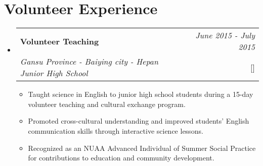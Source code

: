 \documentclass[a4paper,11pt]{article}
\makeatletter
\newcommand{\resumePOR}[3]{
	\vspace{0.5mm}\item
	\begin{tabular*}{0.97\textwidth}[t]{l@{\extracolsep{\fill}}r}
		\textbf{#1}\hspace{0.3mm}#2 & \textit{\small{#3}} 
	\end{tabular*}
	\vspace{-2mm}
}
\newcommand{\resumeProject}[4]{
	\vspace{0.5mm}\item
	\begin{tabular*}{0.98\textwidth}[t]{l@{\extracolsep{\fill}}r}
		\textbf{#1} & \textit{\footnotesize{#3}} \\
		\footnotesize{\textit{#2}} & \footnotesize{#4}
	\end{tabular*}
	\vspace{-2.4mm}
}
\newcommand{\resumeSubHeadingListStart}{\begin{itemize}[leftmargin=*,labelsep=1mm]}
\newcommand{\resumeItemListStart}{\begin{itemize}[leftmargin=*,labelsep=1mm,itemsep=0.5mm]}
\newcommand{\resumeSubHeadingListEnd}{\end{itemize}\vspace{2mm}}
\newcommand{\resumeItemListEnd}{\end{itemize}\vspace{-2mm}}
\makeatother
\begin{document}
	\section{\textbf{Volunteer Experience}}
	\vspace{-0.4mm}
	\resumeSubHeadingListStart

	\resumeProject
	{Volunteer Teaching}
	{Gansu Province - Baiying city - Hepan Junior High School}
	{June 2015 - July 2015}
	{{}[\href{https://1drv.ms/b/c/0b66680558f854cf/EWhZisbqvTNClGJQgjoSEg8BX4o5KTUrmbUno6iK2k-XtA?e=4Ugpkl}{\textcolor{darkblue}{\faIcon{globe}}}]}
	\resumeItemListStart
	\item Taught science in English to junior high school students during a 15-day volunteer teaching and cultural exchange program.
	\item Promoted cross-cultural understanding and improved students' English communication skills through interactive science lessons.
	\item Recognized as an NUAA Advanced Individual of Summer Social Practice for contributions to education and community development.
	\resumeItemListEnd
	
	\resumeSubHeadingListEnd
	\vspace{-6mm}
	
	\begin{comment}
	\section{\textbf{Professional Memberships}}
	\vspace{-0.4mm}
	\resumeSubHeadingListStart
	\resumePOR{Professional Organization A}
	{, Membership ID: XXXXXXXX}
	{Month Year - Present}
	\resumePOR{Professional Organization B}
	{, \href{https://membership-certificate-link.com}{Membership ID: XXXXXXXX}}
	{Month Year - Present}
	\resumePOR{Professional Organization C}
	{, \href{https://membership-certificate-link.com}{Membership ID: XXXXXXXX}}
	{Month Year - Present}
	
	\resumeSubHeadingListEnd
	\vspace{-6mm}
	
	\section{\textbf{Certifications}}
	\vspace{-0.2mm}
	\resumeSubHeadingListStart
	\resumePOR{}{\href{https://certification-link-a.com}{
			\textbf{Certification A}
	}}{Month Year}
	\resumePOR{}{
		\textbf{Certifying Body:} {{\href{https://certification-link-b.com}{Certification B}}}}{Month Year}
	\resumePOR{}{
		\textbf{Certifying Body:} {{\href{https://certification-link-c.com}{Certification C}}}}{Month Year}
	\resumePOR{}{\href{https://certification-link-d.com}{
			\textbf{Certification D}
	}}{Month Year}
	
	\resumeSubHeadingListEnd
	\vspace{-6mm}
	\end{comment}
\end{document}
